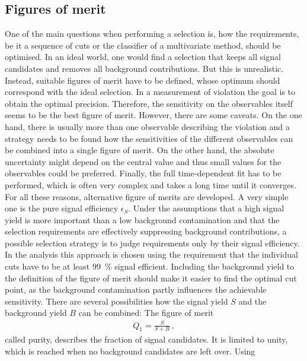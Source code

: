 
\subsection{Figures of merit}
\label{sec:dataanalysis:selection:fom}

One of the main questions when performing a selection is, how the
requirements, be it a sequence of cuts or the classifier of a multivariate
method, should be optimised. In an ideal world, one would find a selection
that keeps all signal candidates and removes all background contributions. But
this is unrealistic. Instead, suitable figures of merit have to be defined,
whose optimum should correspond with the ideal selection.  In a measurement of
\CP violation the goal is to obtain the optimal precision. Therefore, the
sensitivity on the \CP observables itself seems to be the best figure of
merit. However, there are some caveats. On the one hand, there is usually more
than one observable describing the \CP violation and a strategy needs to be
found how the sensitivities of the different \CP observables can be combined
into a single figure of merit. On the other hand, the absolute uncertainty
might depend on the central value and thus small values for the \CP
observables could be preferred. Finally, the full time-dependent fit has to be
performed, which is often very complex and takes a long time until it
converges. For all these reasons, alternative figure of merits are developed.
A very simple one is the pure signal efficiency $\epsilon_S$. Under the
assumptions that a high signal yield is more important than a low background
contamination and that the selection requirements are effectively suppressing
background contributions, a possible selection strategy is to judge
requirements only by their signal efficiency. In the \BdToJPsiKS analysis this
approach is chosen using the requirement that the individual cuts have to be
at least \SI{99}{\percent} signal efficient. Including the background yield to
the definition of the figure of merit should make it easier to find the
optimal cut point, as the background contamination partly influences the
achievable sensitivity. There are several possibilities how the signal yield
$S$ and the background yield $B$ can be combined: The figure of merit
\begin{align}
	Q_1 = \frac{S}{S + B}\,,
\end{align}
called purity, describes the fraction of signal candidates. It is limited to
unity, which is reached when no background candidates are left over. Using
